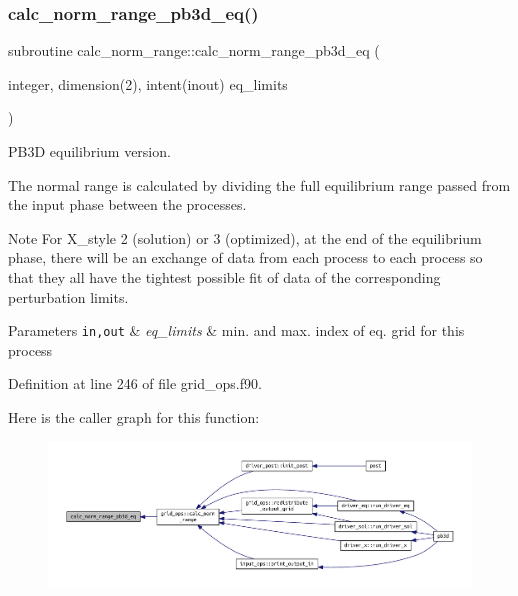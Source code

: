 \subsubsection{\texorpdfstring{calc\+\_\+norm\+\_\+range\+\_\+pb3d\+\_\+eq()}{calc\_norm\_range\_pb3d\_eq()}}
{\footnotesize\ttfamily subroutine calc\+\_\+norm\+\_\+range\+::calc\+\_\+norm\+\_\+range\+\_\+pb3d\+\_\+eq (\begin{DoxyParamCaption}\item[{integer, dimension(2), intent(inout)}]{eq\+\_\+limits }\end{DoxyParamCaption})}



P\+B3D equilibrium version. 

The normal range is calculated by dividing the full equilibrium range passed from the input phase between the processes.

\begin{DoxyNote}{Note}
For X\+\_\+style 2 (solution) or 3 (optimized), at the end of the equilibrium phase, there will be an exchange of data from each process to each process so that they all have the tightest possible fit of data of the corresponding perturbation limits.
\end{DoxyNote}

\begin{DoxyParams}[1]{Parameters}
\mbox{\tt in,out}  & {\em eq\+\_\+limits} & min. and max. index of eq. grid for this process \\
\hline
\end{DoxyParams}


Definition at line 246 of file grid\+\_\+ops.\+f90.

Here is the caller graph for this function\+:\nopagebreak
\begin{figure}[H]
\begin{center}
\leavevmode
\includegraphics[width=350pt]{grid__ops_8f90_a868669b6df6c0fa6a8cedd993042f6ea_icgraph}
\end{center}
\end{figure}
\mbox{\label{grid__ops_8f90_aebe21d718069318bced62bc3d2d09393}} 
